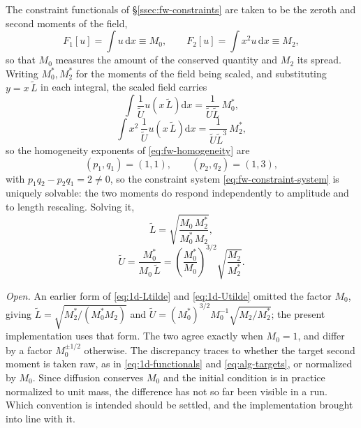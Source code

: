 The constraint functionals of \S\ref{ssec:fw-constraints} are taken to be the
zeroth and second moments of the field,
\begin{equation}\label{eq:1d-functionals}
  F_1[u] = \int u\, \mathrm{d}x \equiv M_0,
  \qquad
  F_2[u] = \int x^2 u\, \mathrm{d}x \equiv M_2,
\end{equation}
so that $M_0$ measures the amount of the conserved quantity and $M_2$ its
spread. Writing $M_0^*, M_2^*$ for the moments of the field being scaled, and
substituting $y = x\, \tilde L$ in each integral, the scaled field carries
\begin{equation}\label{eq:1d-M0-homogeneity}
  \int \frac{1}{\tilde U} u\!\left( x\, \tilde L \right) \mathrm{d}x
  = \frac{1}{\tilde U \tilde L}\, M_0^*,
\end{equation}
\begin{equation}\label{eq:1d-M2-homogeneity}
  \int x^2\, \frac{1}{\tilde U} u\!\left( x\, \tilde L \right) \mathrm{d}x
  = \frac{1}{\tilde U \tilde L^{3}}\, M_2^*,
\end{equation}
so the homogeneity exponents of \eqref{eq:fw-homogeneity} are
\begin{equation}\label{eq:1d-exponents}
  (p_1, q_1) = (1, 1), \qquad (p_2, q_2) = (1, 3),
\end{equation}
with $p_1 q_2 - p_2 q_1 = 2 \neq 0$, so the constraint system
\eqref{eq:fw-constraint-system} is uniquely solvable: the two moments do
respond independently to amplitude and to length rescaling. Solving it,
\begin{equation}\label{eq:1d-Ltilde}
  \tilde L = \sqrt{\frac{M_0\, M_2^*}{M_0^*\, M_2}},
\end{equation}
\begin{equation}\label{eq:1d-Utilde}
  \tilde U = \frac{M_0^*}{M_0\, \tilde L}
  = \left(\frac{M_0^*}{M_0}\right)^{3/2} \sqrt{\frac{M_2}{M_2^*}} .
\end{equation}

\emph{Open.} An earlier form of \eqref{eq:1d-Ltilde} and \eqref{eq:1d-Utilde}
omitted the factor $M_0$, giving
$\tilde L = \sqrt{M_2^*/(M_0^* M_2)}$ and
$\tilde U = (M_0^*)^{3/2} M_0^{-1} \sqrt{M_2/M_2^*}$; the present
implementation uses that form. The two agree exactly when $M_0 = 1$, and
differ by a factor $M_0^{\pm 1/2}$ otherwise. The discrepancy traces to
whether the target second moment is taken raw, as in \eqref{eq:1d-functionals}
and \eqref{eq:alg-targets}, or normalized by $M_0$. Since diffusion conserves
$M_0$ and the initial condition is in practice normalized to unit mass, the
difference has not so far been visible in a run. Which convention is intended
should be settled, and the implementation brought into line with it.

